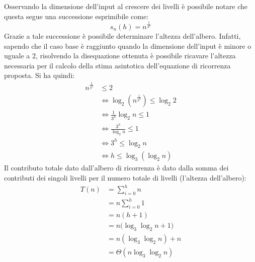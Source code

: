 \begin{center}
\end{center}
Osservando la dimensione dell'input al crescere dei livelli è possibile notare che questa segue una successione esprimibile come:
\begin{displaymath}
	s_{n}(h) = n^{\frac{1}{3^{h}}}
\end{displaymath}
Grazie a tale successione è possibile determinare l'altezza dell'albero. Infatti, sapendo che il caso base è raggiunto quando la dimensione dell'input è minore o uguale a $2$, risolvendo la disequazione ottenuta è possibile ricavare l'altezza necessaria per il calcolo della stima asintotica dell'equazione di ricorrenza proposta. Si ha quindi:
\begin{align*}
	n^{\frac{1}{3^{h}}} &\leq 2 \\
	&\iff \log_{2} (n^{\frac{1}{3^{h}}} ) \leq \log_{2}2 \\
	&\iff \frac{1}{3^{h}} \log_{2} n \leq 1 \\
	&\iff \frac{3^{h}}{\log_{2}n} \leq 1 \\
	&\iff 3^{h} \leq \log_{2} n \\
	& \iff h \leq \log_{3}(\log_{2}n)
\end{align*}
Il contributo totale dato dall'albero di ricorrenza è dato dalla somma dei contributi dei singoli livelli per il numero totale di livelli (l'altezza dell'albero):
\begin{align*}
	T(n)  &= \sum_{i=0}^{h} n \\
	&= n \sum_{i = 0}^{h} 1\\
	&= n(h+1) \\
	&= n\bigl(\log_{3}\log_{2}n +1\bigr) \\
	&= n(\log_{3} \log_{2}n) + n \\
	&= \Theta(n \log_{3}\log_{2}n)
\end{align*} \hfill \blacksquare

